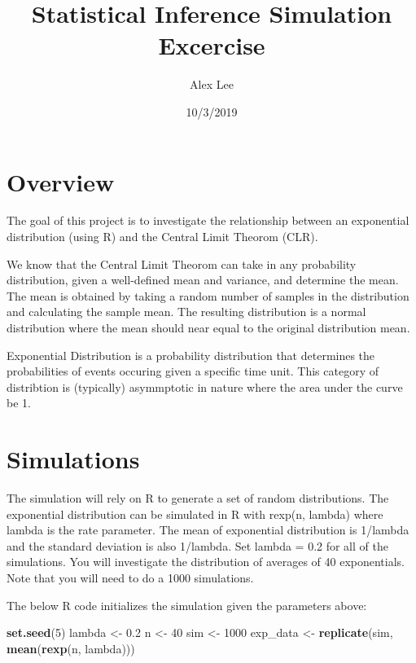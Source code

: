 \documentclass[]{article}
\title{Statistical Inference \textbar{} Simulation Excercise}
\author{Alex Lee}
\date{10/3/2019}
\newenvironment{Shaded}{\begin{snugshade}}{\end{snugshade}}
\newcommand{\DecValTok}[1]{\textcolor[rgb]{0.00,0.00,0.81}{#1}}
\newcommand{\FloatTok}[1]{\textcolor[rgb]{0.00,0.00,0.81}{#1}}
\newcommand{\KeywordTok}[1]{\textcolor[rgb]{0.13,0.29,0.53}{\textbf{#1}}}
\newcommand{\NormalTok}[1]{#1}
\newcommand{\StringTok}[1]{\textcolor[rgb]{0.31,0.60,0.02}{#1}}
\begin{document}
\maketitle

\hypertarget{overview}{%
\section{Overview}\label{overview}}

The goal of this project is to investigate the relationship between an
exponential distribution (using R) and the Central Limit Theorom (CLR).

We know that the Central Limit Theorom can take in any probability
distribution, given a well-defined mean and variance, and determine the
mean. The mean is obtained by taking a random number of samples in the
distribution and calculating the sample mean. The resulting distribution
is a normal distribution where the mean should near equal to the
original distribution mean.

Exponential Distribution is a probability distribution that determines
the probabilities of events occuring given a specific time unit. This
category of distribtion is (typically) asymmptotic in nature where the
area under the curve be 1.

\hypertarget{simulations}{%
\section{Simulations}\label{simulations}}

The simulation will rely on R to generate a set of random distributions.
The exponential distribution can be simulated in R with rexp(n, lambda)
where lambda is the rate parameter. The mean of exponential distribution
is 1/lambda and the standard deviation is also 1/lambda. Set lambda =
0.2 for all of the simulations. You will investigate the distribution of
averages of 40 exponentials. Note that you will need to do a 1000
simulations.

The below R code initializes the simulation given the parameters above:

\begin{Shaded}
\begin{Highlighting}[]
\KeywordTok{set.seed}\NormalTok{(}\DecValTok{5}\NormalTok{)}
\NormalTok{lambda     <-}\StringTok{ }\FloatTok{0.2}
\NormalTok{n          <-}\StringTok{ }\DecValTok{40}
\NormalTok{sim        <-}\StringTok{ }\DecValTok{1000} 
\NormalTok{exp_data   <-}\StringTok{ }\KeywordTok{replicate}\NormalTok{(sim, }\KeywordTok{mean}\NormalTok{(}\KeywordTok{rexp}\NormalTok{(n, lambda)))}
\end{Highlighting}
\end{Shaded}
\end{document}
